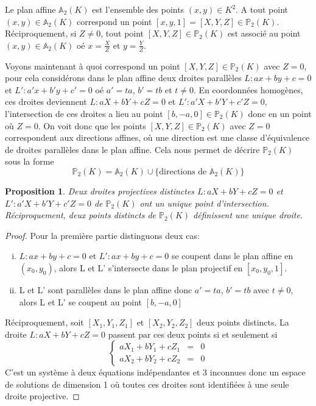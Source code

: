 \documentclass{article}
\newtheorem{proposition}{Proposition}
\begin{document}
Le plan affine $\mathbb{A}_{2}(K)$ est l'ensemble des points $(x,y)\in K^{2}$. A tout point 
$(x,y)\in \mathbb{A}_{2}(K)$ correspond un point $[x,y,1]=[X,Y,Z] \in \mathbb{P}_{2}(K)$.
Réciproquement, si $Z \neq 0$, tout point $[X,Y,Z]\in \mathbb{P}_{2}(K)$ est associé au point
$(x,y)\in \mathbb{A}_{2}(K)$ oé $x=\frac{X}{Z}$ et $y=\frac{Y}{Z}$.

Voyons maintenant à quoi correspond un point $[X,Y,Z]\in \mathbb{P}_{2}(K)$ avec $Z=0$, pour cela considérons
dans le plan affine deux droites parallèles $L: ax+by+c=0$ et $L': a'x+b'y+c'=0$ oé $a'=ta$, $b'=tb$ et $t\neq 0$.
En coordonnées homogènes, ces droites deviennent $L: aX+bY+cZ=0$ et $L': a'X+b'Y+c'Z=0$, l'intersection de ces
droites a lieu au point $[b, -a, 0] \in \mathbb{P}_{2}(K)$ donc en un point où $Z=0$.
On voit donc que les points $[X,Y,Z]\in \mathbb{P}_{2}(K)$ avec $Z=0$ correspondent aux directions affines,
où une direction est une classe d'équivalence de droites parallèles dans le plan affine.
Cela nous permet de décrire $\mathbb{P}_{2}(K)$ sous la forme
\begin{equation*}
\mathbb{P}_{2}(K) = \mathbb{A}_{2}(K) \cup \{\text{directions de }\mathbb{A}_{2}(K)\}
\end{equation*}

\begin{proposition}
Deux droites projectives distinctes $L: aX+bY+cZ=0$ et $L': a'X+b'Y+c'Z=0$ de $\mathbb{P}_{2}(K)$ ont un unique point d'intersection.
Réciproquement, deux points distincts de $\mathbb{P}_{2}(K)$ définissent une unique droite.
\end{proposition}

\begin{proof}
Pour la première partie distinguons deux cas:
\begin{enumerate}[(i)]
\item $L: ax+by+c=0$ et $L': ax+by+c=0$ se coupent dans le plan affine en $(x_{0}, y_{0})$, alors
L et L' s'intersecte dans le plan projectif en $[x_{0}, y_{0}, 1]$.
\item L et L' sont parallèles dans le plan affine donc $a'=ta$, $b'=tb$ avec $t\neq 0$, alors
L et L' se coupent au point $[b, -a, 0]$
\end{enumerate}

Réciproquement, soit $[X_{1}, Y_{1}, Z_{1}]$ et $[X_{2}, Y_{2}, Z_{2}]$ deux points distincts.
La droite $L: aX+bY+cZ=0$ passent par ces deux points si et seulement si
\begin{equation*}
\left\lbrace
\begin{array}{lcl}
aX_{1}+bY_{1}+cZ_{1} &=& 0\\
aX_{2}+bY_{2}+cZ_{2} &=& 0
\end{array}\right.
\end{equation*}
C'est un système à deux équations indépendantes et 3 inconnues donc un espace de solutions de dimension 1
où toutes ces droites sont identifiées à une seule droite projective.
\end{proof}
\end{document}
